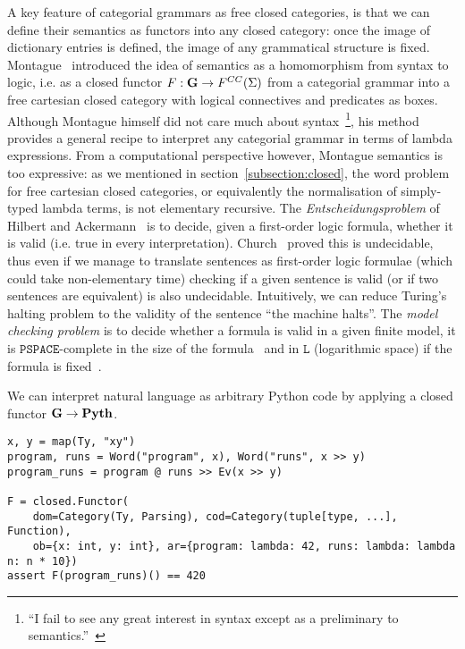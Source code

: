 A key feature of categorial grammars as free closed categories, is that we can define their semantics as functors into any closed category: once the image of dictionary entries is defined, the image of any grammatical structure is fixed.
Montague~\cite{Montague70a,Montague70,Montague73} introduced the idea of semantics as a homomorphism from syntax to logic, i.e. as a closed functor $F : \mathbf{G} \to F^{CC}(\Sigma)$ from a categorial grammar into a free cartesian closed category with logical connectives and predicates as boxes.
Although Montague himself did not care much about syntax~\footnote
{``I fail to see any great interest in syntax except as a preliminary to semantics.''~\cite{Montague70a}},
his method provides a general recipe to interpret any categorial grammar in terms of lambda expressions.
From a computational perspective however, Montague semantics is too expressive: as we mentioned in section~\ref{subsection:closed}, the word problem for free cartesian closed categories, or equivalently the normalisation of simply-typed lambda terms, is not elementary recursive.
The \emph{Entscheidungsproblem} of Hilbert and Ackermann~\cite{HilbertAckerman28} is to decide, given a first-order logic formula, whether it is valid (i.e. true in every interpretation).
Church~\cite{Church36} proved this is undecidable, thus even if we manage to translate sentences as first-order logic formulae (which could take non-elementary time) checking if a given sentence is valid (or if two sentences are equivalent) is also undecidable.
Intuitively, we can reduce Turing's halting problem to the validity of the sentence ``the machine halts''.
The \emph{model checking problem} is to decide whether a formula is valid in a given finite model, it is $\mathtt{PSPACE}$-complete in the size of the formula~\cite[Theorem~4.3]{Gradel02} and in $\mathtt{L}$ (logarithmic space) if the formula is fixed~\cite[Corollary~4.5]{Gradel02}.

\begin{example}
We can interpret natural language as arbitrary Python code by applying a closed functor $\mathbf{G} \to \mathbf{Pyth}$.

\begin{verbatim}
x, y = map(Ty, "xy")
program, runs = Word("program", x), Word("runs", x >> y)
program_runs = program @ runs >> Ev(x >> y)

F = closed.Functor(
    dom=Category(Ty, Parsing), cod=Category(tuple[type, ...], Function),
    ob={x: int, y: int}, ar={program: lambda: 42, runs: lambda: lambda n: n * 10})
assert F(program_runs)() == 420
\end{verbatim}
\end{example}

